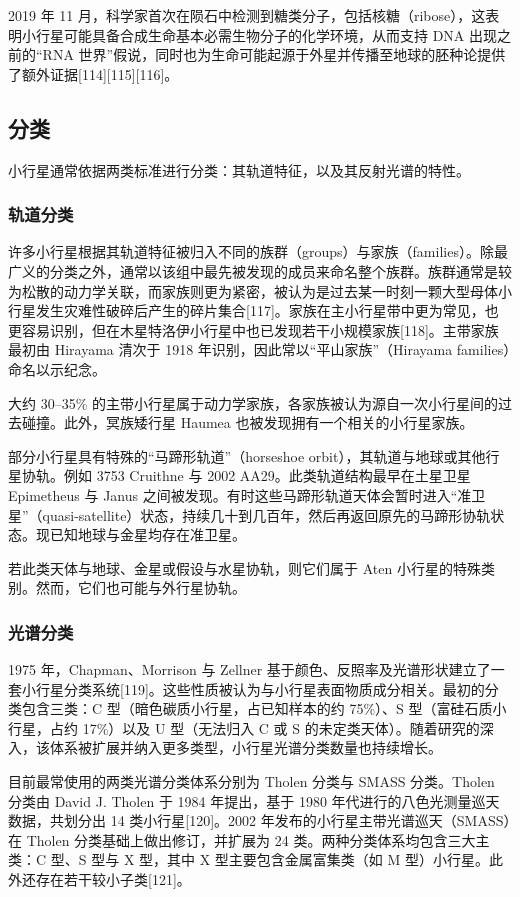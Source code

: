 2019 年 11 月，科学家首次在陨石中检测到糖类分子，包括核糖（ribose），这表明小行星可能具备合成生命基本必需生物分子的化学环境，从而支持 DNA 出现之前的“RNA 世界”假说，同时也为生命可能起源于外星并传播至地球的胚种论提供了额外证据[114][115][116]。
\subsection{分类}
小行星通常依据两类标准进行分类：其轨道特征，以及其反射光谱的特性。
\subsubsection{轨道分类}
许多小行星根据其轨道特征被归入不同的族群（groups）与家族（families）。除最广义的分类之外，通常以该组中最先被发现的成员来命名整个族群。族群通常是较为松散的动力学关联，而家族则更为紧密，被认为是过去某一时刻一颗大型母体小行星发生灾难性破碎后产生的碎片集合[117]。家族在主小行星带中更为常见，也更容易识别，但在木星特洛伊小行星中也已发现若干小规模家族[118]。主带家族最初由 Hirayama 清次于 1918 年识别，因此常以“平山家族”（Hirayama families）命名以示纪念。

大约 30–35\% 的主带小行星属于动力学家族，各家族被认为源自一次小行星间的过去碰撞。此外，冥族矮行星 Haumea 也被发现拥有一个相关的小行星家族。

部分小行星具有特殊的“马蹄形轨道”（horseshoe orbit），其轨道与地球或其他行星协轨。例如 3753 Cruithne 与 2002 AA29。此类轨道结构最早在土星卫星 Epimetheus 与 Janus 之间被发现。有时这些马蹄形轨道天体会暂时进入“准卫星”（quasi-satellite）状态，持续几十到几百年，然后再返回原先的马蹄形协轨状态。现已知地球与金星均存在准卫星。

若此类天体与地球、金星或假设与水星协轨，则它们属于 Aten 小行星的特殊类别。然而，它们也可能与外行星协轨。
\subsubsection{光谱分类} 
1975 年，Chapman、Morrison 与 Zellner 基于颜色、反照率及光谱形状建立了一套小行星分类系统[119]。这些性质被认为与小行星表面物质成分相关。最初的分类包含三类：C 型（暗色碳质小行星，占已知样本的约 75\%）、S 型（富硅石质小行星，占约 17\%）以及 U 型（无法归入 C 或 S 的未定类天体）。随着研究的深入，该体系被扩展并纳入更多类型，小行星光谱分类数量也持续增长。

目前最常使用的两类光谱分类体系分别为 Tholen 分类与 SMASS 分类。Tholen 分类由 David J. Tholen 于 1984 年提出，基于 1980 年代进行的八色光测量巡天数据，共划分出 14 类小行星[120]。2002 年发布的小行星主带光谱巡天（SMASS）在 Tholen 分类基础上做出修订，并扩展为 24 类。两种分类体系均包含三大主类：C 型、S 型与 X 型，其中 X 型主要包含金属富集类（如 M 型）小行星。此外还存在若干较小子类[121]。

